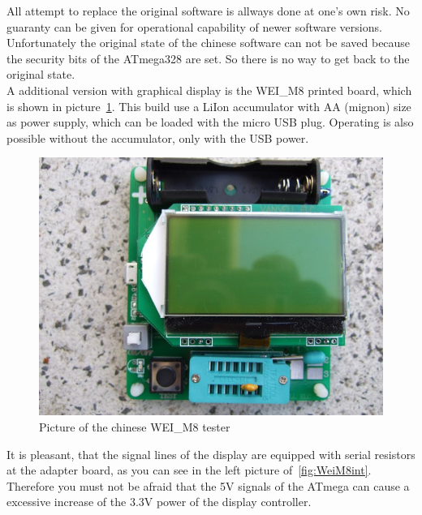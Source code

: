 All attempt to replace the original software is allways done at one's own risk.
No guaranty can be given for operational capability of newer software versions.
Unfortunately the original state of the chinese software can not be saved because the 
security bits of the ATmega328 are set. So there is no way to get back to the original state.\\


A additional version with graphical display is the WEI\_M8 printed board, which is shown in picture~\ref{fig:WeiM8}.
This build use a LiIon accumulator with AA (mignon) size as power supply, which can be loaded
with the micro USB plug. Operating is also possible without the accumulator, only with the USB power.

\begin{figure}[H]
\centering
\includegraphics[width=12cm]{../PNG/WEI_M8.JPG}
\caption{Picture of the chinese WEI\_M8 tester}
\label{fig:WeiM8}
\end{figure}

It is pleasant, that the signal lines of the display are equipped with serial resistors
at the adapter board, as you can see in the left picture of~\ref{fig:WeiM8int}.
Therefore you must not be afraid that the 5V signals of the ATmega can cause a excessive
increase of the 3.3V power of the display controller.

